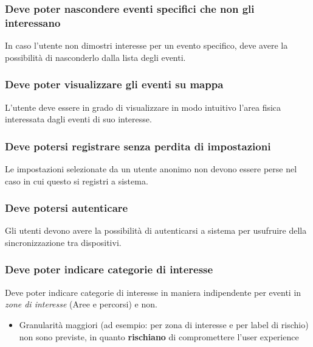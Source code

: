 \documentclass{article}
\begin{document}
\subsubsection{Deve poter nascondere eventi specifici che non gli interessano}
In caso l'utente non dimostri interesse per un evento specifico, deve avere la possibilità di nasconderlo dalla lista degli eventi.

\subsubsection{Deve poter visualizzare gli eventi su mappa}
L'utente deve essere in grado di visualizzare in modo intuitivo l'area fisica interessata dagli eventi di suo interesse. 

\subsubsection{Deve potersi registrare senza perdita di impostazioni}
Le impostazioni selezionate da un utente anonimo non devono essere perse nel caso in cui questo si registri a sistema.

\subsubsection{Deve potersi autenticare}
Gli utenti devono avere la possibilità di autenticarsi a sistema per usufruire della sincronizzazione tra dispositivi.

\subsubsection{Deve poter indicare categorie di interesse}
Deve poter indicare categorie di interesse in maniera indipendente per eventi in \textit{zone di interesse} (Aree e percorsi) e non.
\begin{itemize}
    \item Granularità maggiori (ad esempio: per zona di interesse e per label di rischio) non sono previste, in quanto \textbf{rischiano} di compromettere l'user experience
\end{itemize}
\end{document}
